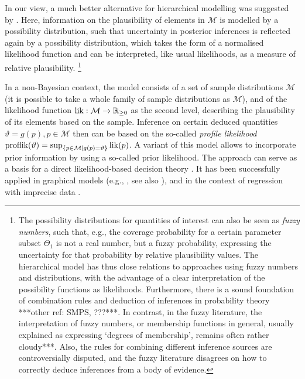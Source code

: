 In our view, a much better alternative for hierarchical modelling was suggested by \textcite{2008:cattaneo}.
Here, information on the plausibility of elements in $\mathcal{M}$ is modelled
by a possibility distribution, such that uncertainty in posterior inferences is reflected
again by a possibility distribution, which takes the form of a normalised likelihood function
and can be interpreted, like usual likelihoods, as a measure of relative plausibility.%
\footnote{The possibility distributions for quantities of interest can also be seen
as \emph{fuzzy numbers}, such that, e.g.,
the coverage probability for a certain parameter subset $\Theta_1$ is not a real number,
but a fuzzy probability, expressing the uncertainty for that probability by relative plausibility values.
The hierarchical model has thus close relations to approaches using fuzzy numbers and distributions,
with the advantage of a clear interpretation of the possibility functions as likelihoods.
Furthermore, there is a sound foundation of combination rules and deduction of inferences in probability theory
\parencite[\S 3]{2007a:cattaneo} ***other ref: SMPS, \textcite{2008:cattaneo}???***.
In contrast, in the fuzzy literature, the interpretation of fuzzy numbers, or membership functions in general,
usually explained as expressing `degrees of membership', remains often rather cloudy***.
Also, the rules for combining different inference sources are controversially disputed,
and the fuzzy literature disagrees on how to correctly deduce inferences from a body of evidence.}

In a non-Bayesian context, the model consists of a set of sample distributions $\mathcal{M}$
(it is possible to take a whole family of sample distributions as $\mathcal{M}$),
and of the likelihood function $\operatorname{lik}: \mathcal{M} \to \mathbb{R}_{\ge 0}$ as the second level,
describing the plausibility of its elements based on the sample.
Inference on certain deduced quantities $\vartheta=g\left(p\right), p \in \mathcal{M}$
then can be based on the so-called \emph{profile likelihood}
$\text{proflik}(\vartheta) = \sup_{\{p \in \mathcal{M} \mid g(p)=\vartheta\}} \operatorname{lik}(p)$.
A variant of this model allows to incorporate prior information by using a so-called prior likelihood.
The approach can serve as a basis for a direct likelihood-based decision theory \parencite{2007a:cattaneo, 2012:cattaneo-technicalRep}.
It has been successfully applied in graphical models (e.g., \cite{2011:4:isipta},
see also \cite[\S 4.3]{itip-classification}), and in the context of regression with imprecise data
\parencite{2012:cattaneo-wiencierz}.

